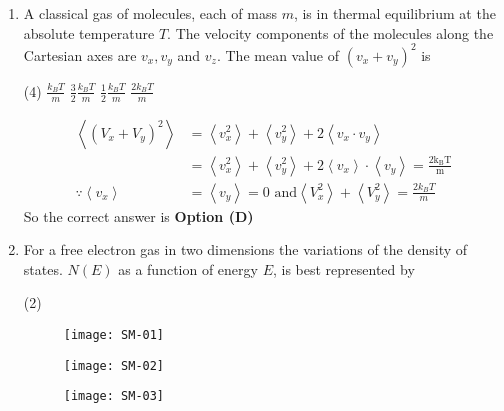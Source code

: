 \begin{enumerate}
\begin{answer}
\begin{align*}
{	So from checking all four options $\left(Z=e^{-\beta E}+e^{-2 \beta E}+e^{-3 \beta E}+e^{-4 \beta E}\right)^{2}$}
\end{align*}
So the correct answer is \textbf{Option (C)}
\end{answer}
	\item  A classical gas of molecules, each of mass $m$, is in thermal equilibrium at the absolute temperature $T .$ The velocity components of the molecules along the Cartesian axes are $v_{x}, v_{y}$ and $v_{z} .$ The mean value of $\left(v_{x}+v_{y}\right)^{2}$ is
\begin{tasks}(4)
\task[\textbf{A.}] $\frac{k_{B} T}{m}$
\task[\textbf{B.}] $\frac{3}{2} \frac{k_{B} T}{m}$
\task[\textbf{C.}] $\frac{1}{2} \frac{k_{B} T}{m}$
\task[\textbf{D.}] $\frac{2 k_{B} T}{m}$
\end{tasks}
\begin{answer}
\begin{align*}
\left\langle\left(V_{x}+V_{y}\right)^{2}\right\rangle&=\left\langle v_{x}^{2}\right\rangle+\left\langle v_{y}^{2}\right\rangle+2\left\langle v_{x} \cdot v_{y}\right\rangle\\&=\left\langle v_{x}^{2}\right\rangle+\left\langle v_{y}^{2}\right\rangle+2\left\langle v_{x}\right\rangle \cdot\left\langle v_{y}\right\rangle=\frac{2 \mathrm{k}_{\mathrm{B}} \mathrm{T}}{\mathrm{m}}\\
\because\left\langle v_{x}\right\rangle&=\left\langle v_{y}\right\rangle=0\text{ and} \left\langle V_{x}^{2}\right\rangle+\left\langle V_{y}^{2}\right\rangle=\frac{2 k_{B} T}{m}
\end{align*}
So the correct answer is \textbf{Option (D)}
\end{answer}
	\item For a free electron gas in two dimensions the variations of the density of states. $N(E)$ as a function of energy $E$, is best represented by
\begin{tasks}(2)
\task[\textbf{A.}] \begin{figure}[H]
	\centering
	\texttt{[image: SM-01]}
\end{figure}
\task[\textbf{B.}] \begin{figure}[H]
	\centering
	\texttt{[image: SM-02]}
\end{figure}
\task[\textbf{C.}]\begin{figure}[H]
	\centering
	\texttt{[image: SM-03]}
\end{figure} 
\task[\textbf{D.}] \begin{figure}[H]

\end{figure}
\end{tasks}
\end{enumerate}
